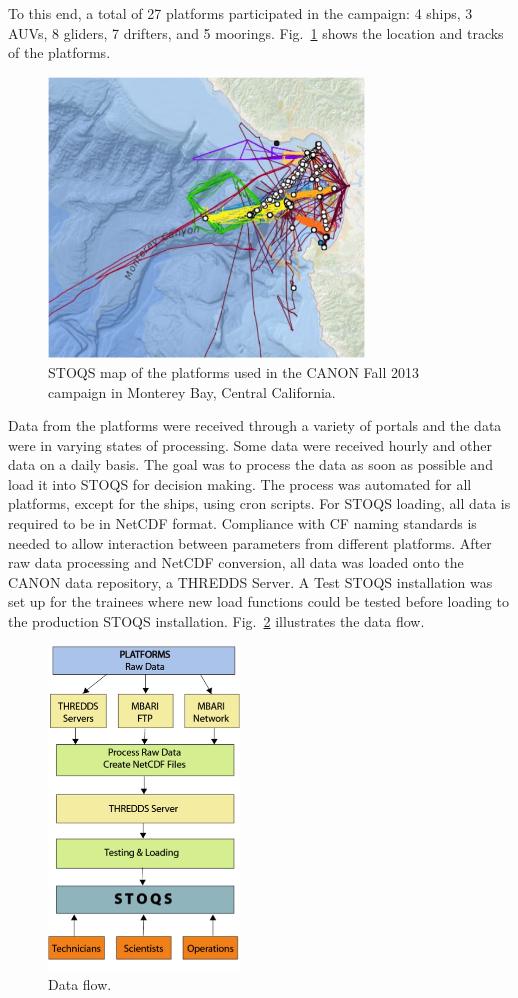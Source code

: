 \documentclass[conference]{IEEEtran}
\begin{document}
To this end, a total of 27 platforms participated in the campaign: 4 ships, 3 AUVs, 8 gliders, 7 drifters, and 5 moorings.  Fig.~\ref{fig:ReikoFigure1} shows the location and tracks of the platforms.

\begin{figure}[htbp]
\centering
\includegraphics[width=3.3in]{ReikoFigure1.png}
\caption{STOQS map of the platforms used in the CANON Fall 2013 campaign in Monterey Bay, Central California.}
\label{fig:ReikoFigure1}
\end{figure}

Data from the platforms were received through a variety of portals and the data were in varying states of processing.  Some data were received hourly and other data on a daily basis.  The goal was to process the data as soon as possible and load it into STOQS for decision making.  The process was automated for all platforms, except for the ships, using cron scripts.  For STOQS loading, all data is required to be in NetCDF format.  Compliance with CF naming standards is needed to allow interaction between parameters from different platforms.  After raw data processing and NetCDF conversion, all data was loaded onto the CANON data repository, a THREDDS Server.  A Test STOQS installation was set up for the trainees where new load functions could be tested before loading to the production STOQS installation.   Fig.~\ref{fig:ReikoFigure2} illustrates the data flow.

\begin{figure}[htbp]
\centering
\includegraphics[width=2.0in]{ReikoFigure2.png}
\caption{Data flow.}
\label{fig:ReikoFigure2}
\end{figure}
\end{document}
